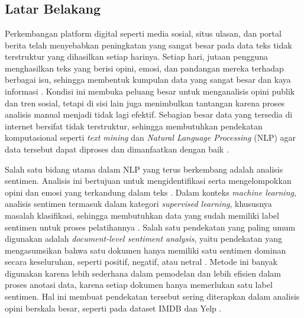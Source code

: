 \chapter{\babSatu}

\section{Latar Belakang}

Perkembangan platform digital seperti media sosial, situs ulasan, dan portal
berita telah menyebabkan peningkatan yang sangat besar pada data teks tidak
terstruktur yang dihasilkan setiap harinya. Setiap hari, jutaan pengguna
menghasilkan teks yang berisi opini, emosi, dan pandangan mereka terhadap
berbagai isu, sehingga membentuk kumpulan data yang sangat besar dan kaya
informasi \parencite{andreotta2019}. Kondisi ini membuka peluang besar untuk
menganalisis opini publik dan tren sosial, tetapi di sisi lain juga menimbulkan
tantangan karena proses analisis manual menjadi tidak lagi efektif. Sebagian
besar data yang tersedia di internet bersifat tidak terstruktur, sehingga
membutuhkan pendekatan komputasional seperti \textit{text mining} dan
\textit{Natural Language Processing} (NLP) agar data tersebut dapat diproses
dan dimanfaatkan dengan baik \parencite{nikhil2015}.

\bigskip

Salah satu bidang utama dalam NLP yang terus berkembang adalah analisis
sentimen. Analisis ini bertujuan untuk mengidentifikasi serta mengelompokkan
opini dan emosi yang terkandung dalam teks \parencite{pang2008opinion}. Dalam
konteks \textit{machine learning}, analisis sentimen termasuk dalam kategori
\textit{supervised learning}, khususnya masalah klasifikasi, sehingga
membutuhkan data yang sudah memiliki label sentimen untuk proses pelatihannya
\parencite{murfi2018}. Salah satu pendekatan yang paling umum digunakan adalah
\textit{document-level sentiment analysis}, yaitu pendekatan yang mengasumsikan
bahwa satu dokumen hanya memiliki satu sentimen dominan secara keseluruhan,
seperti positif, negatif, atau netral \parencite{pang2008opinion}. Metode ini
banyak digunakan karena lebih sederhana dalam pemodelan dan lebih efisien dalam
proses anotasi data, karena setiap dokumen hanya memerlukan satu label
sentimen. Hal ini membuat pendekatan tersebut sering diterapkan dalam analisis
opini berskala besar, seperti pada dataset IMDB dan Yelp
\parencite{zhang2018, maas2011learning, zhang2015character}.

